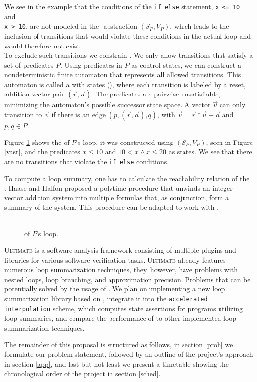 We see in the example that the conditions of the \texttt{if else} statement, \texttt{x <= 10} and \\ \texttt{x > 10}, are not modeled in the \qvasr-abstraction $(S_P, V_P)$, which leads to the inclusion of transitions that would violate these conditions in the actual loop and would therefore not exist. \\
To exclude such transitions we constrain \qvasr. We only allow transitions that satisfy a set of predicates $P$. Using predicates in $P$ as control states, we can construct a nondeterministic finite automaton that represents all allowed transitions. This automaton is called a \qvasr with states (\qvasrs), where each transition is labeled by a reset, addition vector pair $(\vec{r}, \vec{a})$. The predicates are pairwise unsatisfiable, minimizing the automaton's possible successor state space. A vector $\vec{u}$ can only transition to $\vec{v}$ if there is an edge $(p, (\vec{r}, \vec{a}), q)$, with $\vec{v} = \vec{r} * \vec{u} + \vec{a}$ and $p, q \in P$. \par
Figure \ref{vasrs} shows the \qvasrs of $P$'s loop, it was constructed using $(S_P, V_P)$, seen in Figure \ref{vasr}, and the predicates $x \leq 10$ and $10 < x \land x \leq 20$ as states. We see that there are no transitions that violate the \texttt{if else} conditions. \par
To compute a loop summary, one has to calculate the reachability relation of the \qvasrs. Haase and Halfon \cite{DBLP:conf/rp/HaaseH14} proposed a polytime procedure that unwinds an integer vector addition system into multiple formulas that, as conjunction, form a summary of the system. This procedure can be adapted to work with \qvasrs. \\ \par
\begin{figure}[H]
	
	\caption{\\ \qvasrs of $P$'s loop.}
	\label{vasrs}
\end{figure}
\textsc{Ultimate}\cite{Zitat02} is a software analysis framework consisting of multiple plugins and libraries for various software verification tasks. \textsc{Ultimate} already features numerous loop summarization techniques, they, however, have problems with nested loops, loop branching, and approximation precision. Problems that can be potentially solved by the usage of \qvasrs. We plan on implementing a new loop summarization library based on \qvasrs, integrate it into the \texttt{accelerated interpolation} scheme, which computes state assertions for programs utilizing loop summaries, and compare the performance of \qvasrs to other implemented loop summarization techniques. \par
The remainder of this proposal is structured as follows, in section \ref{prob} we formulate our problem statement, followed by an outline of the project's approach in section \ref{app}, and last but not least we present a timetable showing the chronological order of the project in section \ref{sched}.
